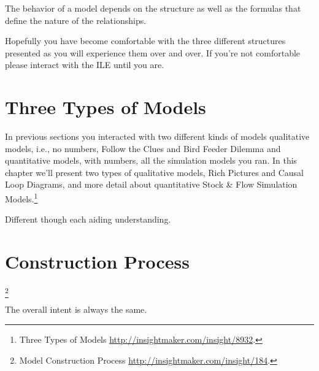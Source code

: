 \documentclass[]{memoir}
\begin{document}
\FloatBarrier 

\begin{model}[frametitle={Model: Similar Structures / Different Behavior}] 

 The behavior of a model depends on the structure as well as the formulas that define the nature of the relationships.




 \end{model}

Hopefully you have become comfortable with the three different
structures presented as you will experience them over and over. If
you're not comfortable please interact with the ILE until you are.

\section{Three Types of Models}

In previous sections you interacted with two different kinds of models
qualitative models, i.e., no numbers, Follow the Clues and Bird Feeder
Dilemma and quantitative models, with numbers, all the simulation models
you ran. In this chapter we'll present two types of qualitative models,
Rich Pictures and Causal Loop Diagrams, and more detail about
quantitative Stock \& Flow Simulation Models.\footnote{Three Types of
  Models \url{http://insightmaker.com/insight/8932}.}

\FloatBarrier 

\begin{model}[frametitle={Model: Three Types of Models}] 

 Different though each aiding understanding.




 \end{model}

\section{Construction Process}

\footnote{Model Construction Process
  \url{http://insightmaker.com/insight/184}.}

\FloatBarrier 

\begin{model}[frametitle={Model: Model Construction Process}] 

 The overall intent is always the same.




 \end{model}
\end{document}
